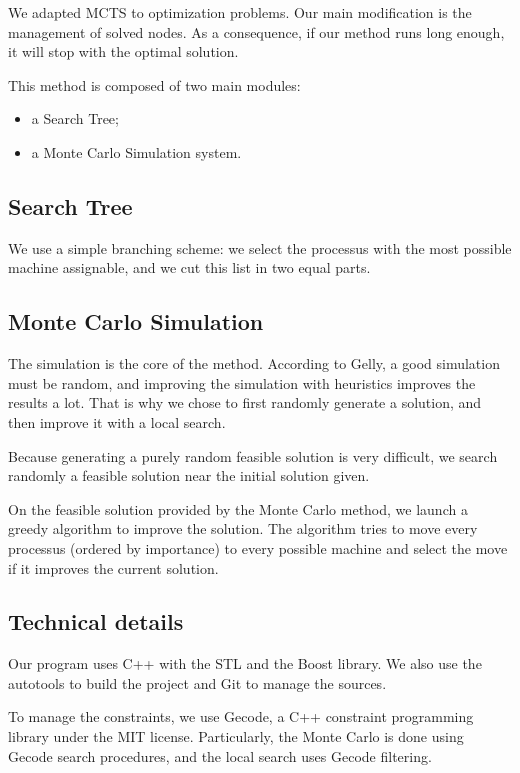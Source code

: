 \documentclass[a4paper,twocolumn]{article}
\begin{document}
We adapted MCTS to optimization problems. Our main modification is
the management of solved nodes.  As a consequence, if our method runs
long enough, it will stop with the optimal solution.

This method is composed of two main modules:
\begin{itemize}
\item a Search Tree;
\item a Monte Carlo Simulation system.
\end{itemize}

\subsection{Search Tree}

We use a simple branching scheme: we select the processus with the
most possible machine assignable, and we cut this list in two equal
parts.

\subsection{Monte Carlo Simulation}

The simulation is the core of the method.  According to
Gelly\cite{gelly2007contribution}, a good simulation must be random, and
improving the simulation with heuristics improves the results a lot.
That is why we chose to first randomly generate a solution, and
then improve it with a local search.

Because generating a purely random feasible solution is very
difficult, we search randomly a feasible solution near the
initial solution given.

On the feasible solution provided by the Monte Carlo method, we launch
a greedy algorithm to improve the solution.  The algorithm tries to move
every processus (ordered by importance) to every possible machine and
select the move if it improves the current solution.

\subsection{Technical details}

Our program uses C++ with the STL and the Boost library.  We also use
the autotools to build the project and Git to manage the sources.

To manage the constraints, we use Gecode, a C++ constraint programming
library under the MIT license.  Particularly, the Monte Carlo is done
using Gecode search procedures, and the local search uses Gecode
filtering.
\end{document}
